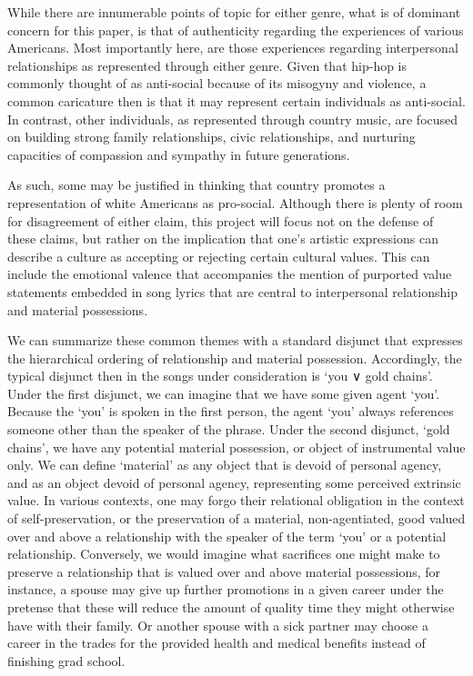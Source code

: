 \documentclass[
  letterpaper,
  DIV=11,
  numbers=noendperiod]{scrartcl}
\theoremstyle{remark}
\begin{document}
While there are innumerable points of topic for either genre, what is of
dominant concern for this paper, is that of authenticity regarding the
experiences of various Americans. Most importantly here, are those
experiences regarding interpersonal relationships as represented through
either genre. Given that hip-hop is commonly thought of as anti-social
because of its misogyny and violence, a common caricature then is that
it may represent certain individuals as anti-social. In contrast, other
individuals, as represented through country music, are focused on
building strong family relationships, civic relationships, and nurturing
capacities of compassion and sympathy in future generations.

As such, some may be justified in thinking that country promotes a
representation of white Americans as pro-social. Although there is
plenty of room for disagreement of either claim, this project will focus
not on the defense of these claims, but rather on the implication that
one's artistic expressions can describe a culture as accepting or
rejecting certain cultural values. This can include the emotional
valence that accompanies the mention of purported value statements
embedded in song lyrics that are central to interpersonal relationship
and material possessions.

We can summarize these common themes with a standard disjunct that
expresses the hierarchical ordering of relationship and material
possession. Accordingly, the typical disjunct then in the songs under
consideration is `you ∨ gold chains'. Under the first disjunct, we can
imagine that we have some given agent `you'. Because the `you' is spoken
in the first person, the agent `you' always references someone other
than the speaker of the phrase. Under the second disjunct, `gold
chains', we have any potential material possession, or object of
instrumental value only. We can define `material' as any object that is
devoid of personal agency, and as an object devoid of personal agency,
representing some perceived extrinsic value. In various contexts, one
may forgo their relational obligation in the context of
self-preservation, or the preservation of a material, non-agentiated,
good valued over and above a relationship with the speaker of the term
`you' or a potential relationship. Conversely, we would imagine what
sacrifices one might make to preserve a relationship that is valued over
and above material possessions, for instance, a spouse may give up
further promotions in a given career under the pretense that these will
reduce the amount of quality time they might otherwise have with their
family. Or another spouse with a sick partner may choose a career in the
trades for the provided health and medical benefits instead of finishing
grad school.
\end{document}
